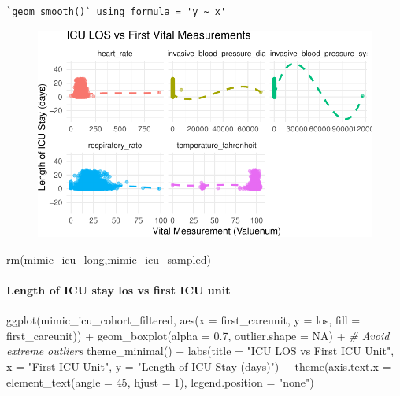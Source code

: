 \documentclass[
]{article}
\let\oldparagraph\paragraph
\renewcommand{\paragraph}[1]{\oldparagraph{#1}\mbox{}}
\newenvironment{Shaded}{\begin{snugshade}}{\end{snugshade}}
\newcommand{\AttributeTok}[1]{\textcolor[rgb]{0.77,0.63,0.00}{#1}}
\newcommand{\CommentTok}[1]{\textcolor[rgb]{0.56,0.35,0.01}{\textit{#1}}}
\newcommand{\ConstantTok}[1]{\textcolor[rgb]{0.00,0.00,0.00}{#1}}
\newcommand{\DecValTok}[1]{\textcolor[rgb]{0.00,0.00,0.81}{#1}}
\newcommand{\FloatTok}[1]{\textcolor[rgb]{0.00,0.00,0.81}{#1}}
\newcommand{\FunctionTok}[1]{\textcolor[rgb]{0.00,0.00,0.00}{#1}}
\newcommand{\NormalTok}[1]{\textcolor[rgb]{0.00,0.00,0.00}{#1}}
\newcommand{\SpecialCharTok}[1]{\textcolor[rgb]{0.00,0.00,0.00}{#1}}
\newcommand{\StringTok}[1]{\textcolor[rgb]{0.31,0.60,0.02}{#1}}
\begin{document}
\begin{verbatim}
`geom_smooth()` using formula = 'y ~ x'
\end{verbatim}

\begin{figure}[H]

{\centering \includegraphics{hw3_files/figure-pdf/8.7-1.pdf}

}

\end{figure}

\begin{Shaded}
\begin{Highlighting}[]
\FunctionTok{rm}\NormalTok{(mimic\_icu\_long,mimic\_icu\_sampled)}
\end{Highlighting}
\end{Shaded}

\hypertarget{length-of-icu-stay-los-vs-first-icu-unit}{%
\paragraph{Length of ICU stay los vs first ICU
unit}\label{length-of-icu-stay-los-vs-first-icu-unit}}

\begin{Shaded}
\begin{Highlighting}[]
\FunctionTok{ggplot}\NormalTok{(mimic\_icu\_cohort\_filtered, }\FunctionTok{aes}\NormalTok{(}\AttributeTok{x =}\NormalTok{ first\_careunit, }\AttributeTok{y =}\NormalTok{ los, }
                                      \AttributeTok{fill =}\NormalTok{ first\_careunit)) }\SpecialCharTok{+}
  \FunctionTok{geom\_boxplot}\NormalTok{(}\AttributeTok{alpha =} \FloatTok{0.7}\NormalTok{, }\AttributeTok{outlier.shape =} \ConstantTok{NA}\NormalTok{) }\SpecialCharTok{+}  \CommentTok{\# Avoid extreme outliers}
  \FunctionTok{theme\_minimal}\NormalTok{() }\SpecialCharTok{+}
  \FunctionTok{labs}\NormalTok{(}\AttributeTok{title =} \StringTok{"ICU LOS vs First ICU Unit"}\NormalTok{,}
       \AttributeTok{x =} \StringTok{"First ICU Unit"}\NormalTok{, }\AttributeTok{y =} \StringTok{"Length of ICU Stay (days)"}\NormalTok{) }\SpecialCharTok{+}
  \FunctionTok{theme}\NormalTok{(}\AttributeTok{axis.text.x =} \FunctionTok{element\_text}\NormalTok{(}\AttributeTok{angle =} \DecValTok{45}\NormalTok{, }\AttributeTok{hjust =} \DecValTok{1}\NormalTok{), }
        \AttributeTok{legend.position =} \StringTok{"none"}\NormalTok{)}
\end{Highlighting}
\end{Shaded}
\end{document}
